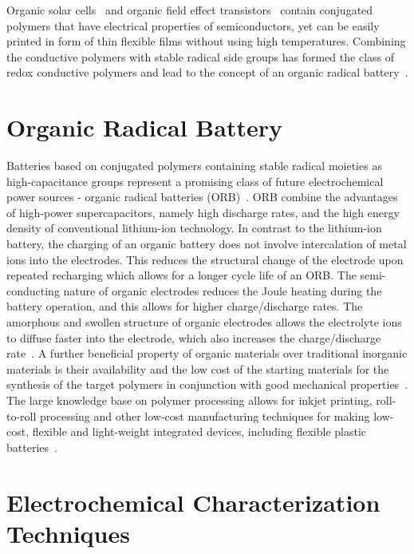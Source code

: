 \par

Organic solar cells~\cite{Lee_1993} and organic field effect transistors~\cite{Koezuka_1987} contain conjugated polymers that have electrical properties of semiconductors, yet can be easily printed in form of thin flexible films without using high temperatures. Combining the conductive polymers with stable radical side groups has formed the class of redox conductive polymers and lead to the concept of an organic radical battery~\cite{Rohland_2021}.




\section{Organic Radical Battery}

Batteries based on conjugated polymers containing stable radical moieties as high-capacitance groups represent a promising class of future electrochemical power sources - organic radical batteries (ORB)~\cite{nakahara2002_cpl, nishide2004_electact,xie2021_mathoriz,Rohland2022}. ORB combine the advantages of high-power supercapacitors, namely high discharge rates, and the high energy density of conventional lithium-ion technology. In contrast to the lithium-ion battery, the charging of an organic battery does not involve intercalation of metal ions into the electrodes. This reduces the structural change of the electrode upon repeated recharging which allows for a longer cycle life of an ORB. The semi-conducting nature of organic electrodes reduces the Joule heating during the battery operation, and this allows for higher charge/discharge rates. The amorphous and swollen structure of organic electrodes allows the electrolyte ions to diffuse faster into the electrode, which also increases the charge/discharge rate~\cite{nishide_2009}. A further beneficial property of organic materials over traditional inorganic materials is their availability and the low cost of the starting materials for the synthesis of the target polymers in conjunction with good mechanical properties~\cite{janoschka2012_advmater, muench2016_chemrev, friebe2017_topcurrchem}. The large knowledge base on polymer processing allows for inkjet printing, roll-to-roll processing and other low-cost manufacturing techniques for making low-cost, flexible and light-weight integrated devices, including flexible plastic batteries~\cite{janoschka2012_advmater,nishide_2009}. 
\par
\section{Electrochemical Characterization Techniques}


